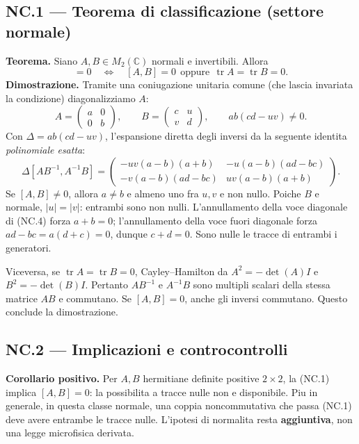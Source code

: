 \documentclass[11pt,a4paper]{article}
\begin{document}
\subsection*{NC.1 --- Teorema di classificazione (settore normale)}
\textbf{Teorema.} Siano $A,B\in M_2(\mathbb C)$ normali e invertibili. Allora
\begin{equation}
[AB^{-1},A^{-1}B]=0\quad\Longleftrightarrow\quad
[A,B]=0\ \ \text{oppure}\ \ \operatorname{tr}A=\operatorname{tr}B=0.\tag{NC.2}
\end{equation}
\textbf{Dimostrazione.} Tramite una coniugazione unitaria comune (che lascia invariata la condizione) diagonalizziamo $A$:
\begin{equation}
A=\begin{pmatrix}a&0\\0&b\end{pmatrix},\qquad
B=\begin{pmatrix}c&u\\v&d\end{pmatrix},\qquad
ab(cd-uv)\ne0.\tag{NC.3}
\end{equation}
Con $\Delta=ab(cd-uv)$, l'espansione diretta degli inversi da la seguente identita \emph{polinomiale esatta}:
\begin{equation}
\Delta[AB^{-1},A^{-1}B]=
\begin{pmatrix}
-uv(a-b)(a+b)&-u(a-b)(ad-bc)\\
-v(a-b)(ad-bc)&uv(a-b)(a+b)
\end{pmatrix}.\tag{NC.4}
\end{equation}
Se $[A,B]\ne0$, allora $a\ne b$ e almeno uno fra $u,v$ e non nullo. Poiche $B$ e normale, $|u|=|v|$: entrambi sono non nulli. L'annullamento della voce diagonale di (NC.4) forza $a+b=0$; l'annullamento della voce fuori diagonale forza $ad-bc=a(d+c)=0$, dunque $c+d=0$. Sono nulle le tracce di entrambi i generatori.

Viceversa, se $\operatorname{tr}A=\operatorname{tr}B=0$, Cayley--Hamilton da $A^2=-\det(A)I$ e $B^2=-\det(B)I$. Pertanto $AB^{-1}$ e $A^{-1}B$ sono multipli scalari della stessa matrice $AB$ e commutano. Se $[A,B]=0$, anche gli inversi commutano. Questo conclude la dimostrazione.

\newpage
\newpage
\subsection*{NC.2 --- Implicazioni e controcontrolli}
\textbf{Corollario positivo.} Per $A,B$ hermitiane definite positive $2\times2$, la (NC.1) implica $[A,B]=0$: la possibilita a tracce nulle non e disponibile. Piu in generale, in questa classe normale, una coppia noncommutativa che passa (NC.1) deve avere entrambe le tracce nulle. L'ipotesi di normalita resta \textbf{aggiuntiva}, non una legge microfisica derivata.
\end{document}
